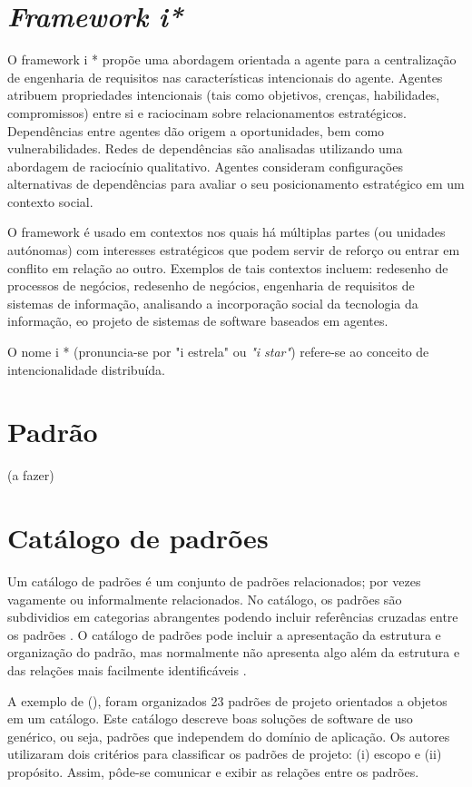 \section{\textit{Framework i*}}


O framework i * propõe uma abordagem orientada a agente para a centralização de engenharia de requisitos nas características intencionais do agente. Agentes atribuem propriedades intencionais (tais como objetivos, crenças, habilidades, compromissos) entre si e raciocinam sobre relacionamentos estratégicos. Dependências entre agentes dão origem a oportunidades, bem como vulnerabilidades. Redes de dependências são analisadas utilizando uma abordagem de raciocínio qualitativo. Agentes consideram configurações alternativas de dependências para avaliar o seu posicionamento estratégico em um contexto social.

O framework é usado em contextos nos quais há múltiplas partes (ou unidades autónomas) com interesses estratégicos que podem servir de reforço ou entrar em conflito em relação ao outro. Exemplos de tais contextos incluem: redesenho de processos de negócios, redesenho de negócios, engenharia de requisitos de sistemas de informação, analisando a incorporação social da tecnologia da informação, eo projeto de sistemas de software baseados em agentes.

O nome i * (pronuncia-se por "i estrela" ou \textit{"i star"}) refere-se ao conceito de intencionalidade distribuída.

\section{Padrão}

(a fazer)

\section{Catálogo de padrões}

Um catálogo de padrões é um conjunto de padrões relacionados; por vezes vagamente ou informalmente relacionados. No catálogo, os padrões são subdividios em categorias abrangentes podendo incluir referências cruzadas entre os padrões \cite{appleton1997}. O catálogo de padrões pode incluir a apresentação da estrutura e organização do padrão, mas normalmente não apresenta algo além da estrutura e das relações mais  facilmente identificáveis \cite{appleton1997}.

A exemplo de \citeauthor{gamma1995} (\citeyear{gamma1995}), foram organizados 23 padrões de projeto orientados a objetos em um catálogo. Este catálogo descreve boas soluções de software de uso genérico, ou seja, padrões que independem do domínio de aplicação. Os autores utilizaram dois critérios para classificar os padrões de projeto: (i) escopo e (ii) propósito. Assim, pôde-se comunicar e exibir as relações entre os padrões.

